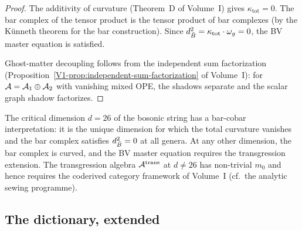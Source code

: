 \begin{proof}
The additivity of curvature (Theorem~D of Volume~I) gives
$\kappa_{\mathrm{tot}} = 0$. The bar complex of the tensor product is
the tensor product of bar complexes (by the K\"unneth theorem for the
bar construction). Since $d_{\bar{B}}^2 = \kappa_{\mathrm{tot}} \cdot
\omega_g = 0$, the BV master equation is satisfied.

Ghost-matter decoupling follows from the independent sum factorization
(Proposition~\ref*{V1-prop:independent-sum-factorization} of Volume~I):
for $\mathcal{A} = \mathcal{A}_1 \oplus \mathcal{A}_2$ with vanishing mixed OPE, the shadows
separate and the scalar graph shadow factorizes.
\end{proof}

\begin{remark}[Central charge $c = 26$ from bar-cobar]
The critical dimension $d = 26$ of the bosonic string has a bar-cobar
interpretation: it is the unique dimension for which the total curvature
vanishes and the bar complex satisfies $d_{\bar{B}}^2 = 0$ at all genera.
At any other dimension, the bar complex is curved, and the BV master
equation requires the transgression extension. The transgression
algebra $\mathcal{A}^{\mathrm{trans}}$ at $d \neq 26$ has non-trivial $m_0$
and hence requires the coderived category framework of Volume~I
(cf.\ the analytic sewing programme).
\end{remark}

\subsection{The dictionary, extended}

